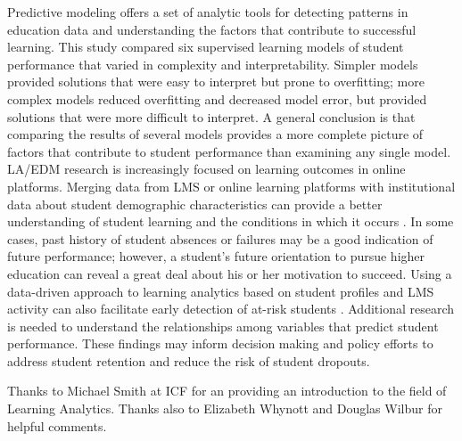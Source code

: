 \documentclass[sigconf]{acmart}
\begin{document}
Predictive modeling offers a set of analytic tools for detecting patterns in 
education data and understanding the factors that contribute to successful
learning. This study compared six supervised learning models of student 
performance that varied in complexity and interpretability. Simpler models 
provided solutions that were easy to interpret but prone to overfitting;
more complex models reduced overfitting and decreased model error, but 
provided solutions that were more difficult to interpret. A general conclusion 
is that comparing the results of several models provides a more complete 
picture of factors that contribute to student performance than examining any 
single model. LA/EDM research is increasingly focused on learning outcomes in 
online platforms. Merging data from LMS or online learning platforms with 
institutional data about student demographic characteristics can provide a 
better understanding of student learning and the conditions in which it 
occurs \cite{hora19, siemens12}. In some cases, past history of student 
absences or failures may be a good indication of future performance;
however, a student's future orientation to pursue higher education can 
reveal a great deal about his or her motivation to succeed. Using a 
data-driven approach to learning analytics based on student profiles and 
LMS activity can also facilitate early detection of at-risk students 
\cite{Dekkar09}. Additional research is needed to understand the relationships 
among variables that predict student performance. These findings may inform 
decision making and policy efforts to address student retention and reduce the 
risk of student dropouts.

\begin{acks}

Thanks to Michael Smith at ICF for an providing an introduction to the field
of Learning Analytics. Thanks also to Elizabeth Whynott and Douglas Wilbur 
for helpful comments. 

\end{acks}


 
\end{document}
